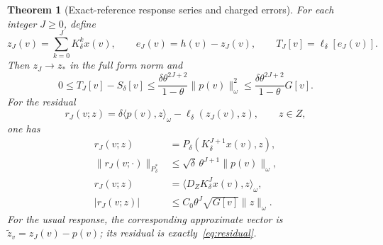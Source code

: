 \documentclass[11pt,a4paper]{article}
\numberwithin{equation}{section}
\newtheorem{theorem}{Theorem}[section]
\theoremstyle{remark}
\newcommand{\ip}[2]{\langle #1,#2\rangle}
\newcommand{\norm}[1]{\lVert #1\rVert}
\begin{document}
\begin{theorem}[Exact-reference response series and charged errors]\label{thm:neumann}
For each integer $J\ge0$, define
\begin{equation}\label{eq:iterates}
 z_J(v)=\sum_{k=0}^JK_\delta^kx(v),\qquad
 e_J(v)=h(v)-z_J(v),\qquad T_J[v]=\ell_\delta[e_J(v)].
\end{equation}
Then $z_J\to z_*$ in the full form norm and
\begin{equation}\label{eq:Schurerror}
 0\le T_J[v]-S_\delta[v]
 \le\frac{\delta\theta^{2J+2}}{1-\theta}\norm{p(v)}_\omega^2
 \le\frac{\delta\theta^{2J+2}}{1-\theta}G[v].
\end{equation}
For the residual
\begin{equation}\label{eq:residual}
 r_J(v;z)=\delta\ip{p(v)}z_\omega-\ell_\delta(z_J(v),z),
 \qquad z\in Z,
\end{equation}
one has
\begin{align}
 r_J(v;z)&=P_\delta(K_\delta^{J+1}x(v),z),\label{eq:energyrow}\\
 \norm{r_J(v;\cdot)}_{P_\delta^*}
 &\le\sqrt\delta\,\theta^{J+1}\norm{p(v)}_\omega,\label{eq:energyresidual}\\
 r_J(v;z)&=\ip{D_ZK_\delta^Jx(v)}z_\omega,\label{eq:weightedrow}\\
 |r_J(v;z)|&\le C_0\theta^J\sqrt{G[v]}\norm z_\omega.\label{eq:weightedresidual}
\end{align}
For the usual response, the corresponding approximate vector is
$\widetilde z_v=z_J(v)-p(v)$; its residual is exactly~\eqref{eq:residual}.
\end{theorem}
\end{document}
